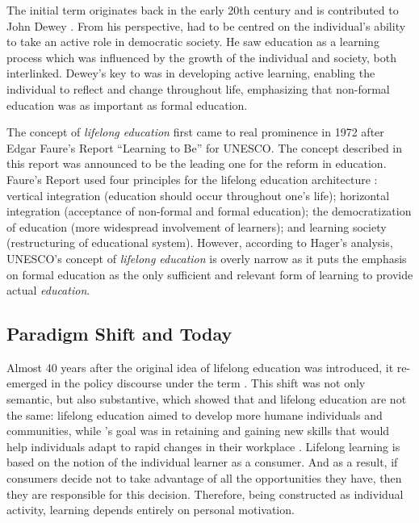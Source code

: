 The initial term \textit{\LLLsn} originates back in the early 20th century
and is contributed to John Dewey \citeyearpar{Dewey2004}. From his
perspective, \LLLs had to be centred on the individual's ability to take an
active role in democratic society. He saw education as a learning process which
was influenced by the growth of the individual and society, both interlinked.
Dewey's key to \LLLs was in developing active learning, enabling the individual
to reflect and change throughout life, emphasizing that non-formal education was
as important as formal education.

The concept of \textit{lifelong education} first came to real prominence in 1972
after Edgar Faure's Report ``Learning to Be'' for UNESCO. The concept described
in this report was announced to be the leading one for the reform in education.
Faure's Report used four principles for the lifelong education architecture
\citep{Faure1972}: vertical integration (education should occur throughout one's
life); horizontal integration (acceptance of non-formal and formal education);
the democratization of education (more widespread involvement of learners); and
learning society (restructuring of educational system). However, according to
Hager's \citeyearpar{Hager2011} analysis, UNESCO's concept of \textit{lifelong
education} is overly narrow as it puts the emphasis on formal education as the
only sufficient and relevant form of learning to provide actual
\textit{education}.

\subsection{Paradigm Shift and \LLLc Today}

Almost 40 years after the original idea of lifelong education was introduced, 
it re-emerged in the policy discourse under the term \LLLs \citep{Boshier2000}.
This shift was not only semantic, but also substantive, which showed that \LLLs
and lifelong education are not the same: lifelong education aimed to develop
more humane individuals and communities, while \LLLsn's goal was in retaining
and gaining new skills that would help individuals adapt to rapid changes in
their workplace \citep{Medel-Anonuevo2001}. Lifelong learning is based on the
notion of the individual learner as a consumer. And as a result, if consumers
decide not to take advantage of all the opportunities they have, then they are
responsible for this decision. Therefore, being constructed as individual
activity, learning depends entirely on personal motivation.

